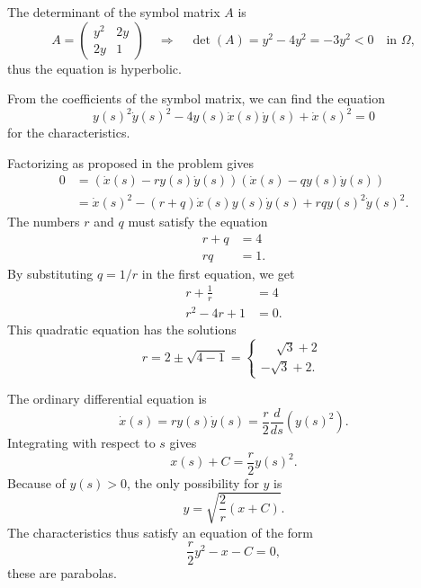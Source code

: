 \begin{loesung}
\begin{teilaufgaben}
\item
The determinant of the symbol matrix $A$ is
\[
A=\begin{pmatrix}
y^2&2y\\
2y&1
\end{pmatrix}
\quad\Rightarrow\quad
\det (A)=y^2-4y^2=-3y^2<0 \quad\text{in $\Omega$},
\]
thus the equation is hyperbolic.
\item
From the coefficients of the symbol matrix, we can find the equation
\[
y(s)^2\dot y(s)^2-4y(s)\dot x(s)\dot y(s)+\dot x(s)^2=0
\]
for the characteristics.
\item
Factorizing as proposed in the problem gives
\begin{align*}
0&=(\dot x(s)-ry(s)\dot y(s))(\dot x(s)-qy(s)\dot y(s))
\\
&=\dot x(s)^2-(r+q)\dot x(s) y(s)\dot y(s)+rqy(s)^2\dot y(s)^2.
\end{align*}
The numbers $r$ and $q$ must satisfy the equation
\begin{align*}
r+q&=4\\
rq&=1.
\end{align*}
By substituting
$q=1/r$ in the first equation, we get
\begin{align*}
r+\frac1r&=4\\
r^2-4r+1&=0.
\end{align*}
This quadratic equation has the solutions
\begin{equation}
r
=
2\pm\sqrt{4-1}
=
\begin{cases}
\phantom{-}\sqrt{3}+2\phantom{.}\\
         - \sqrt{3}+2.
\end{cases}
\label{90000001:r}
\end{equation}
\item
The ordinary differential equation is
\[
\dot x(s)=ry(s)\dot y(s)=\frac{r}{2}\frac{d}{ds}(y(s)^2).
\]
Integrating with respect to $s$ gives
\[
x(s) + C=\frac{r}{2}y(s)^2.
\]
Because of $y(s)>0$, the only possibility for $y$ is
\[
y = \sqrt{\frac{2}{r}(x+C)}.
\]
The characteristics thus satisfy an equation of the form
\begin{equation}
\frac{r}2y^2-x-C=0,
\label{90000001:parabola}
\end{equation}
these are parabolas.
\end{teilaufgaben}
\begin{figure}
\centering
{}
\begin{tikzpicture}[>=latex,thick]

\end{tikzpicture}
\end{figure}
\end{loesung}
